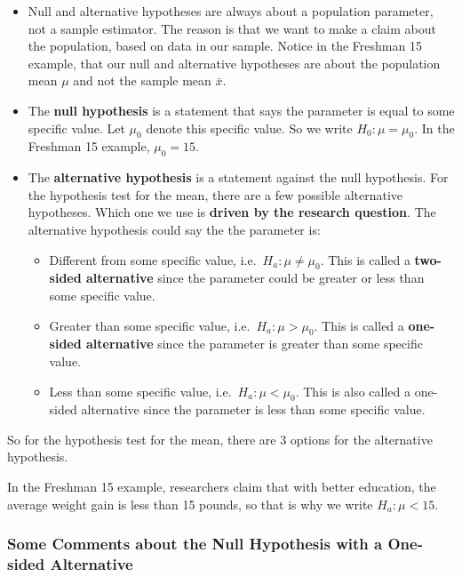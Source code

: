 \documentclass[
]{book}
\begin{document}
\begin{itemize}
\item
  Null and alternative hypotheses are always about a population parameter, not a sample estimator. The reason is that we want to make a claim about the population, based on data in our sample. Notice in the Freshman 15 example, that our null and alternative hypotheses are about the population mean \(\mu\) and not the sample mean \(\bar{x}\).
\item
  The \textbf{null hypothesis} is a statement that says the parameter is equal to some specific value. Let \(\mu_0\) denote this specific value. So we write \(H_0: \mu = \mu_0\). In the Freshman 15 example, \(\mu_0 = 15\).
\item
  The \textbf{alternative hypothesis} is a statement against the null hypothesis. For the hypothesis test for the mean, there are a few possible alternative hypotheses. Which one we use is \textbf{driven by the research question}. The alternative hypothesis could say the the parameter is:

  \begin{itemize}
  \item
    Different from some specific value, i.e.~\(H_a: \mu \neq \mu_0\). This is called a \textbf{two-sided alternative} since the parameter could be greater or less than some specific value.
  \item
    Greater than some specific value, i.e.~\(H_a: \mu > \mu_0\). This is called a \textbf{one-sided alternative} since the parameter is greater than some specific value.
  \item
    Less than some specific value, i.e.~\(H_a: \mu < \mu_0\). This is also called a one-sided alternative since the parameter is less than some specific value.
  \end{itemize}
\end{itemize}

So for the hypothesis test for the mean, there are 3 options for the alternative hypothesis.

In the Freshman 15 example, researchers claim that with better education, the average weight gain is less than 15 pounds, so that is why we write \(H_a: \mu < 15\).

\hypertarget{some-comments-about-the-null-hypothesis-with-a-one-sided-alternative}{%
\subsubsection{Some Comments about the Null Hypothesis with a One-sided Alternative}\label{some-comments-about-the-null-hypothesis-with-a-one-sided-alternative}}
\end{document}

